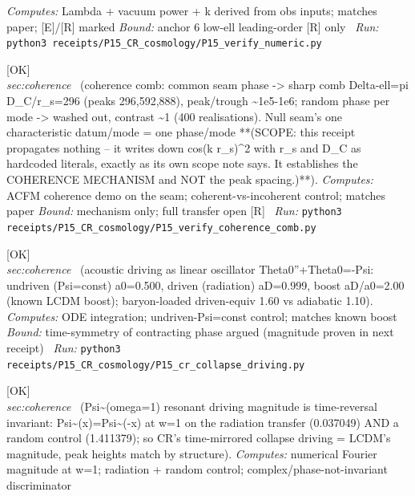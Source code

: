 \begin{description}
\emph{Computes:} Lambda + vacuum power + k derived from obs inputs; matches paper; [E]/[R] marked
 \emph{Bound:} anchor 6 low-ell leading-order [R] only
\ \emph{Run:} \texttt{python3 receipts/P15\_CR\_cosmology/P15\_verify\_numeric.py}
\item[\rcptlabel{P15_verify_coherence_comb}{P15R18}\textbf{P15R18}\quad\texttt{P15\_verify\_coherence\_comb}]\hfill\textsf{[OK]}\\
\textit{sec:coherence} \ (coherence comb: common seam phase -> sharp comb Delta-ell=pi D\_C/r\_s=296 (peaks 296,592,888), peak/trough \textasciitilde{}1e5-1e6; random phase per mode -> washed out, contrast \textasciitilde{}1 (400 realisations). Null seam's one characteristic datum/mode = one phase/mode **(SCOPE: this receipt propagates nothing -- it writes down cos(k r\_s)\textasciicircum{}2 with r\_s and D\_C as hardcoded literals, exactly as its own scope note says. It establishes the COHERENCE MECHANISM and NOT the peak spacing.)**). 
\emph{Computes:} ACFM coherence demo on the seam; coherent-vs-incoherent control; matches paper
 \emph{Bound:} mechanism only; full transfer open [R]
\ \emph{Run:} \texttt{python3 receipts/P15\_CR\_cosmology/P15\_verify\_coherence\_comb.py}
\item[\rcptlabel{P15_cr_collapse_driving}{P15R19}\textbf{P15R19}\quad\texttt{P15\_cr\_collapse\_driving}]\hfill\textsf{[OK]}\\
\textit{sec:coherence} \ (acoustic driving as linear oscillator Theta0''+Theta0=-Psi: undriven (Psi=const) a0=0.500, driven (radiation) aD=0.999, boost aD/a0=2.00 (known LCDM boost); baryon-loaded driven-equiv 1.60 vs adiabatic 1.10). 
\emph{Computes:} ODE integration; undriven-Psi=const control; matches known boost
 \emph{Bound:} time-symmetry of contracting phase argued (magnitude proven in next receipt)
\ \emph{Run:} \texttt{python3 receipts/P15\_CR\_cosmology/P15\_cr\_collapse\_driving.py}
\item[\rcptlabel{P15_time_reversal_driving}{P15R20}\textbf{P15R20}\quad\texttt{P15\_time\_reversal\_driving}]\hfill\textsf{[OK]}\\
\textit{sec:coherence} \ (\textbar{}Psi\textasciitilde{}(omega=1)\textbar{} resonant driving magnitude is time-reversal invariant: \textbar{}Psi\textasciitilde{}(x)\textbar{}=\textbar{}Psi\textasciitilde{}(-x)\textbar{} at w=1 on the radiation transfer (0.037049) AND a random control (1.411379); so CR's time-mirrored collapse driving = LCDM's magnitude, peak heights match by structure). 
\emph{Computes:} numerical Fourier magnitude at w=1; radiation + random control; complex/phase-not-invariant discriminator

\end{description}
